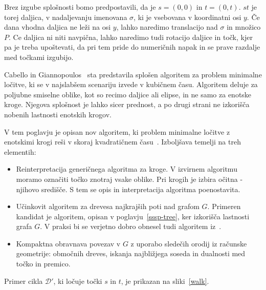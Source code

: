\documentclass[a4paper, 12pt]{book}
\newcommand{\D}{\ensuremath{\mathcal{D}}}
\begin{document}
Brez izgube splošnosti bomo predpostavili, da je $s=(0,0)$ in $t=(0,t)$. $st$ je torej daljica, v nadaljevanju imenovana $\sigma$, ki je vsebovana v koordinatni osi $y$. Če dana vhodna daljica ne leži na osi $y$, lahko naredimo translacijo nad $\sigma$ in množico $P$. Ce daljica ni niti navpična, lahko naredimo tudi rotacijo daljice in točk, kjer pa je treba upoštevati, da pri tem pride do numeričnih napak in se prave razdalje med točkami izgubijo. 

Cabello in Giannopoulos~\cite{CG16} sta predstavila splošen algoritem za problem minimalne ločitve, ki se v najslabšem scenariju izvede v kubičnem času. Algoritem deluje za poljubne smiselne oblike, kot so recimo daljice ali elipse, in ne samo za enotske kroge. Njegova splošnost je lahko sicer prednost, a po drugi strani ne izkorišča nobenih lastnosti enotskih krogov.

V tem poglavju je opisan nov algoritem, ki problem minimalne ločitve z enotskimi krogi reši v skoraj kvadratičnem času~\cite{CM}. Izboljšava temelji na treh elementih:
\begin{itemize}
\item Reinterpretacija generičnega algoritma za kroge. V izvirnem algoritmu moramo označiti točko znotraj vsake oblike. Pri krogih je izbira očitna - njihovo središče. S tem se opis in interpretacija algoritma poenostavita.
\item Učinkovit algoritem za drevesa najkrajših poti nad grafom $G$. Primeren kandidat je algoritem, opisan v poglavju~\ref{sssp-tree}, ker izkorišča lastnosti grafa $G$. V praksi bi se verjetno dobro obnesel tudi algoritem iz~\cite{ChanS16}.
\item Kompaktna obravnava povezav v $G$ z uporabo sledečih orodij iz računske geometrije: območnih dreves, iskanja najbližjega soseda in dualnosti med točko in premico. 
\end{itemize}

Primer cikla $\D'$, ki ločuje točki $s$ in $t$, je prikazan na sliki~\ref{walk}.
\end{document}
